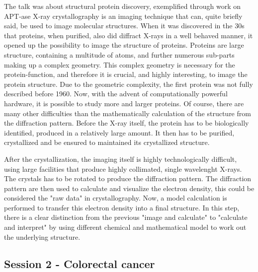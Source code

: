 \documentclass[12p]{article}
\begin{document}
The talk was about structural protein discovery, exemplified through work on APT-ase
X-ray crystallography is an imaging technique that can, quite briefly said, be used to image molecular structures.
When it was discovered in the 30s that proteins, when purified, also did diffract X-rays in a well behaved manner, it opened up the possibility to image the structure of proteins.
Proteins are large structure, containing a multitude of atoms, and further numerous sub-parts making up a complex geometry.
This complex geometry is necessary for the protein-function, and therefore it is crucial, and highly interesting, to image the protein structure.
Due to the geometric complexity, the first protein was not fully described before 1960.
Now, with the advent of computationally  powerful hardware, it is possible to study more and larger proteins.
Of course, there are many other difficulties than the mathematically calculation of the structure from the diffraction pattern.
Before the X-ray itself, the protein has to be biologically identified, produced in a relatively large amount.
It then has to be purified, crystallized and be ensured to maintained its crystallized structure.

After the crystallization, the imaging itself is highly technologically difficult, using large facilities that produce highly collimated, single wavelenght X-rays.
The crystals has to be rotated to produce the diffraction pattern.
The diffraction pattern are then used to calculate and visualize the electron density, this could be considered the "raw data" in crystallography.
Now, a model calculation is performed to transfer this electron density into a final structure.
In this step, there is a clear distinction from the previous "image and calculate" to "calculate and interpret" by using different chemical and mathematical model to work out the underlying structure.

\subsection*{Session 2 - Colorectal cancer}
\end{document}
